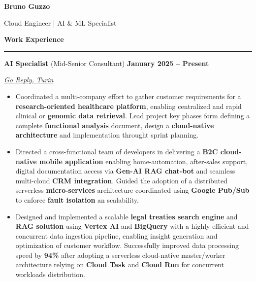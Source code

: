 \documentclass[9pt, a4paper]{article}
\newcommand{\cvsection}[1]{%
	\vspace{2pt}\par
	{\Large\bfseries\color{sectionblue}#1}\par
	\vspace{2pt}\hrule\vspace{6pt}
}
\newcommand{\jobsection}[3]{%
	\par {\large #1} \hfill {\bfseries #2} \par {\textit{#3}} \vspace{4pt}
}
\begin{document}
	
	\begin{center}
		{\Huge\bfseries Bruno Guzzo}\par
		\vspace{4pt}
		{\Large Cloud Engineer | AI \& ML Specialist}
	\end{center}
	
	\begin{minipage}[t]{0.65\linewidth}
		\vspace{0pt} %
		
		\cvsection{Work Experience}
		
		\jobsection{\textbf{AI Specialist} (Mid-Senior Consultant)}{January 2025 -- Present}{\href{https://www.reply.com/go-reply/en}{Go Reply, Turin}}
		
		\begin{itemize}[leftmargin=*, nosep]
			\item \footnotesize Coordinated a multi-company effort to gather customer requirements for a \textbf{research-oriented healthcare platform}, enabling centralized and rapid clinical or \textbf{genomic data retrieval}. Lead project key phases form defining a complete \textbf{functional analysis} document, design a \textbf{cloud-native architecture} and implementation throught sprint planning.      
			
			\vspace{5pt}
			\item \footnotesize Directed a cross-functional team of developers in delivering a \textbf{B2C cloud-native mobile application} enabling home-automation, after-sales support, digital documentation access via \textbf{Gen-AI RAG chat-bot} and seamless multi-cloud \textbf{CRM integration}. Guided the adoption of a distributed serverless \textbf{micro-services} architecture coordinated using \textbf{Google Pub/Sub} to enforce \textbf{fault isolation} an scalability. 
			
			\vspace{5pt}
			\item \footnotesize Designed and implemented a scalable \textbf{legal treaties search engine} and \textbf{RAG solution} using \textbf{Vertex AI} and \textbf{BigQuery} with a highly efficient and concurrent data ingestion pipeline, enabling insight generation and optimization of customer workflow. 
			Successfully improved data processing speed by \textbf{94\%} after adopting a serverless cloud-native master/worker architecture relying on \textbf{Cloud Task} and \textbf{Cloud Run} for concurrent workloads distribution.      
			

\end{itemize}
\end{minipage}
\end{document}
